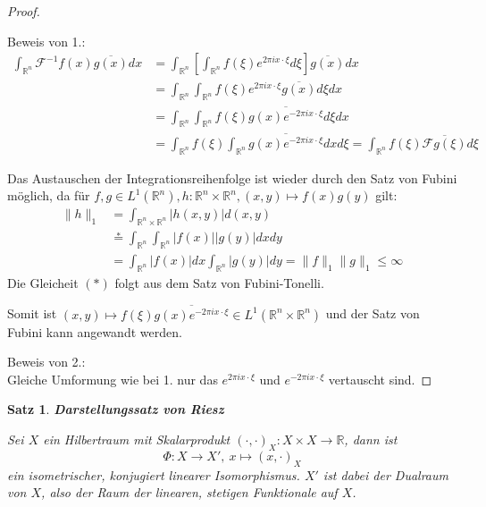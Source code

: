\documentclass{article}
\newcommand{\R}[0]{\mathbb{R}}
\newcommand{\F}[0]{\mathcal{F}}
\theoremstyle{plain}
\newtheorem{thm}{Satz}[section]
\theoremstyle{definition}
\begin{document}
\begin{proof}\cite[S. 427f.]{ebert2018methods}
    
    Beweis von 1.:\\
    \begin{align*}
        \int_{\R^n}\F^{-1}f(x)\overline{g(x)}dx &= \int_{\R^n} \left[ \int_{\R^n} f(\xi) e^{2 \pi i x \cdot \xi} d\xi \right] \overline{g(x)}dx \\
        &= \int_{\R^n} \int_{\R^n} f(\xi) e^{2 \pi i x \cdot \xi} \overline{g(x)} d\xi dx \\
        &= \int_{\R^n} \int_{\R^n} f(\xi) \overline{g(x) e^{-2 \pi i x \cdot \xi}} d\xi dx \\
        &= \int_{\R^n} f(\xi) \int_{\R^n} \overline{g(x) e^{-2 \pi i x \cdot \xi}} dx d\xi = \int_{\R^n}f(\xi)\overline{\F g(\xi)} d\xi
    \end{align*}

    Das Austauschen der Integrationsreihenfolge ist wieder durch den Satz von Fubini möglich, da für $f,g \in L^1(\R^n), h: \R^n \times \R^n, (x,y) \mapsto f(x)g(y)$ gilt:
    \begin{align*}
        \lVert h \rVert_1 &= \int_{\R^n \times \R^n} |h(x, y)| d(x,y) \\
        &\overset{*}{=} \int_{\R^n} \int_{\R^n} |f(x)| |g(y)| dx dy \\
        &= \int_{\R^n} |f(x)| dx \int_{\R^n} |g(y)| dy = \lVert f \rVert_1 \lVert g \rVert_1 \leq \infty
    \end{align*}
    Die Gleicheit $(*)$ folgt aus dem Satz von Fubini-Tonelli.
    
    Somit ist $(x,y) \mapsto f(\xi) \overline{g(x) e^{-2 \pi i x \cdot \xi}} \in L^1(\R^n \times \R^n)$ und der Satz von Fubini kann angewandt werden.

    Beweis von 2.:\\
    Gleiche Umformung wie bei 1. nur das $e^{2 \pi i x \cdot \xi}$ und $e^{-2 \pi i x \cdot \xi}$ vertauscht sind.
    
\end{proof}

\begin{thm}\label{thm:riesz} \textbf{Darstellungssatz von Riesz}
    
    Sei $X$ ein Hilbertraum mit Skalarprodukt $(\cdot, \cdot)_X: X \times X \to \R$, dann ist 
    \begin{equation}
        \varPhi: X \to X', \: x \mapsto (x, \cdot)_X
    \end{equation}
    ein isometrischer, konjugiert linearer Isomorphismus. $X'$ ist dabei der Dualraum von $X$, also der Raum der linearen, stetigen Funktionale auf $X$. 
\end{thm}
\end{document}
